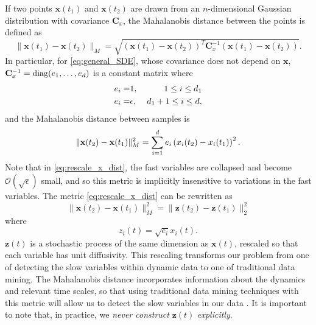 If two points $\mathbf{x}(t_1)$ and $\mathbf{x}(t_2)$ are drawn from an $n$-dimensional
Gaussian distribution with covariance $\mathbf{C}_x$, the Mahalanobis distance between the points is defined as \cite{mahalanobis1936generalized}
\begin{equation}
	\| \mathbf{x}(t_1) - \mathbf{x}(t_2) \| _M = \sqrt{ (\mathbf{x}(t_1) - \mathbf{x}(t_2))^T \mathbf{C}_x^{-1} (\mathbf{x}(t_1) - \mathbf{x}(t_2) )  }.
\end{equation}
In particular, 
for \eqref{eq:general_SDE}, whose covariance does not depend on $\mathbf{x}$,  $\mathbf{C}_x^{-1} = \mathrm{diag}(e_1, \ldots, e_d)$ is a constant matrix where
\begin{equation} \label{eq:e_def}
\begin{aligned}
e_i =& 1, \: & 1 \le i \le d_1 \\
e_i =& \epsilon, \: & d_1+1 \le i \le d,
\end{aligned}
\end{equation}
and the Mahalanobis distance between samples is
\begin{equation} \label{eq:rescale_x_dist}
\| \mathbf{x}(t_2) - \mathbf{x}(t_1) \|^2_M = \sum_{i=1}^d e_i \left( x_i(t_2) - x_i(t_1) \right)^2.
\end{equation}
Note that in \eqref{eq:rescale_x_dist}, the fast variables are collapsed and become $\mathcal{O}(\sqrt{\epsilon})$ small,
and so this metric is implicitly insensitive to variations in the fast variables.
%
The metric \eqref{eq:rescale_x_dist} can be rewritten as
\begin{equation} \label{eq:norm_z}
\| \mathbf{x}(t_2) - \mathbf{x}(t_1) \|^2_M = \| \mathbf{z}(t_2) - \mathbf{z}(t_1) \|^2_2
\end{equation}
where
\begin{equation} \label{eq:general_rescale}
z_i(t) = \sqrt{e_i} x_i(t).
\end{equation}
$\mathbf{z}(t)$ is a stochastic process of the same dimension as $\mathbf{x}(t)$, rescaled so that each variable has unit diffusivity.
%
This rescaling transforms our problem from one of detecting the slow variables within dynamic data to one of traditional data mining.
%
The Mahalanobis distance incorporates information about the dynamics and relevant time scales, so that using traditional data mining techniques with this metric will allow us to detect the slow variables in our data \cite{singer2009detecting}.
%
It is important to note that, in practice, we {\em never construct} $\mathbf{z}(t)$ {\em explicitly}.
